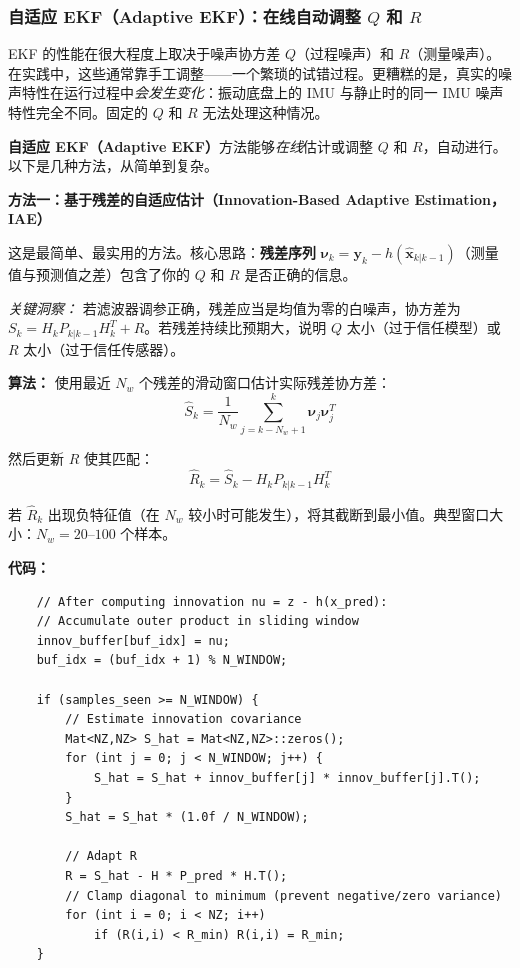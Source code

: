 \subsubsection{自适应 EKF（Adaptive EKF）：在线自动调整 \texorpdfstring{$Q$}{Q} 和 \texorpdfstring{$R$}{R}}

EKF 的性能在很大程度上取决于噪声协方差 $Q$（过程噪声）和 $R$（测量噪声）。在实践中，这些通常靠手工调整——一个繁琐的试错过程。更糟糕的是，真实的噪声特性在运行过程中\textit{会发生变化}：振动底盘上的 IMU 与静止时的同一 IMU 噪声特性完全不同。固定的 $Q$ 和 $R$ 无法处理这种情况。

\textbf{自适应 EKF（Adaptive EKF）}方法能够\textit{在线}估计或调整 $Q$ 和 $R$，自动进行。以下是几种方法，从简单到复杂。

\textbf{方法一：基于残差的自适应估计（Innovation-Based Adaptive Estimation，IAE）}

这是最简单、最实用的方法。核心思路：\textbf{残差序列} $\boldsymbol{\nu}_k = \mathbf{y}_k - h(\hat{\mathbf{x}}_{k|k-1})$（测量值与预测值之差）包含了你的 $Q$ 和 $R$ 是否正确的信息。

\textit{关键洞察：} 若滤波器调参正确，残差应当是均值为零的白噪声，协方差为 $S_k = H_k P_{k|k-1} H_k^T + R$。若残差持续比预期大，说明 $Q$ 太小（过于信任模型）或 $R$ 太小（过于信任传感器）。

\textbf{算法：} 使用最近 $N_w$ 个残差的滑动窗口估计实际残差协方差：
\begin{equation}
\hat{S}_k = \frac{1}{N_w} \sum_{j=k-N_w+1}^{k} \boldsymbol{\nu}_j \boldsymbol{\nu}_j^T
\end{equation}

然后更新 $R$ 使其匹配：
\begin{equation}
\hat{R}_k = \hat{S}_k - H_k P_{k|k-1} H_k^T
\end{equation}

若 $\hat{R}_k$ 出现负特征值（在 $N_w$ 较小时可能发生），将其截断到最小值。典型窗口大小：$N_w = 20$--$100$ 个样本。

\textbf{代码：}
\begin{verbatim}
    // After computing innovation nu = z - h(x_pred):
    // Accumulate outer product in sliding window
    innov_buffer[buf_idx] = nu;
    buf_idx = (buf_idx + 1) % N_WINDOW;

    if (samples_seen >= N_WINDOW) {
        // Estimate innovation covariance
        Mat<NZ,NZ> S_hat = Mat<NZ,NZ>::zeros();
        for (int j = 0; j < N_WINDOW; j++) {
            S_hat = S_hat + innov_buffer[j] * innov_buffer[j].T();
        }
        S_hat = S_hat * (1.0f / N_WINDOW);

        // Adapt R
        R = S_hat - H * P_pred * H.T();
        // Clamp diagonal to minimum (prevent negative/zero variance)
        for (int i = 0; i < NZ; i++)
            if (R(i,i) < R_min) R(i,i) = R_min;
    }
\end{verbatim}

